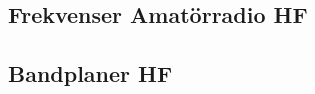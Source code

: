 \begin{landscape}
\section{Frekvenser Amatörradio HF}


\subsection{Bandplaner HF}


\end{landscape}
